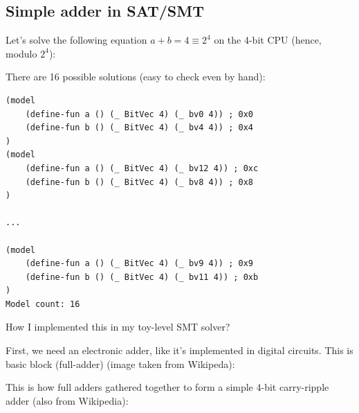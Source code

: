 \subsection{Simple adder in SAT/SMT}

Let's solve the following equation $a+b=4 \equiv 2^4$ on the 4-bit CPU (hence, modulo $2^4$):



There are 16 possible solutions (easy to check even by hand):

\begin{lstlisting}
(model
	(define-fun a () (_ BitVec 4) (_ bv0 4)) ; 0x0
	(define-fun b () (_ BitVec 4) (_ bv4 4)) ; 0x4
)
(model
	(define-fun a () (_ BitVec 4) (_ bv12 4)) ; 0xc
	(define-fun b () (_ BitVec 4) (_ bv8 4)) ; 0x8
)

...

(model
	(define-fun a () (_ BitVec 4) (_ bv9 4)) ; 0x9
	(define-fun b () (_ BitVec 4) (_ bv11 4)) ; 0xb
)
Model count: 16
\end{lstlisting}

How I implemented this in my toy-level SMT solver?

First, we need an electronic adder, like it's implemented in digital circuits.
This is basic block (full-adder) (image taken from Wikipeda):

\begin{figure}[H]
\centering
{}
\end{figure}

This is how full adders gathered together to form a simple 4-bit carry-ripple adder (also from Wikipedia):

\begin{figure}[H]
\centering
{}
\end{figure}

